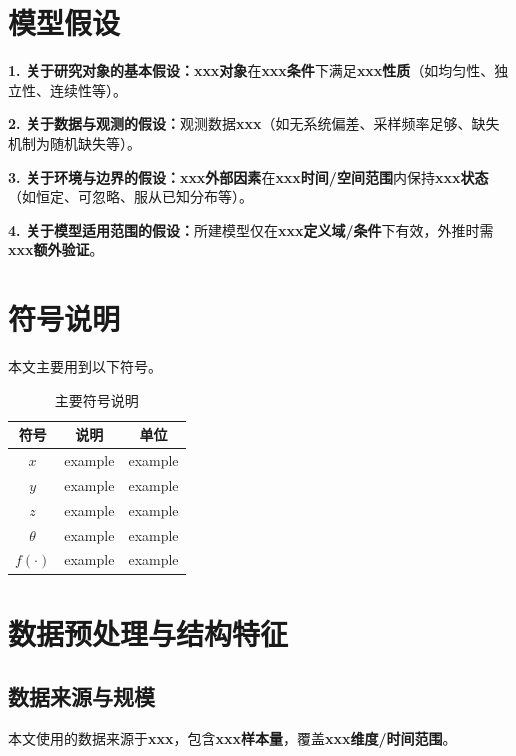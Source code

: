 \documentclass[draft,12pt,a4paper]{ctexart}
\theoremstyle{definition}
\begin{document}
\newpage
\section{模型假设}

\textbf{1. 关于研究对象的基本假设：}\textbf{xxx对象}在\textbf{xxx条件}下满足\textbf{xxx性质}（如均匀性、独立性、连续性等）。

\textbf{2. 关于数据与观测的假设：}观测数据\textbf{xxx}（如无系统偏差、采样频率足够、缺失机制为随机缺失等）。

\textbf{3. 关于环境与边界的假设：}\textbf{xxx外部因素}在\textbf{xxx时间/空间范围}内保持\textbf{xxx状态}（如恒定、可忽略、服从已知分布等）。

\textbf{4. 关于模型适用范围的假设：}所建模型仅在\textbf{xxx定义域/条件}下有效，外推时需\textbf{xxx额外验证}。

\section{符号说明}
本文主要用到以下符号。
\begin{table}[H]\centering
  \caption{主要符号说明}\label{tab:symbol}
  \small
  \begin{tabular}{ccc}
    \toprule
    \textbf{符号} & \textbf{说明} & \textbf{单位} \\
    \midrule
    $x$ & example & example \\
    $y$ & example & example \\
    $z$ & example & example \\
    $\theta$ & example & example \\
    $f(\cdot)$ & example & example \\
    \bottomrule
  \end{tabular}
\end{table}

\newpage
\section{数据预处理与结构特征}
\subsection{数据来源与规模}
本文使用的数据来源于\textbf{xxx}，包含\textbf{xxx样本量}，覆盖\textbf{xxx维度/时间范围}。
\end{document}
